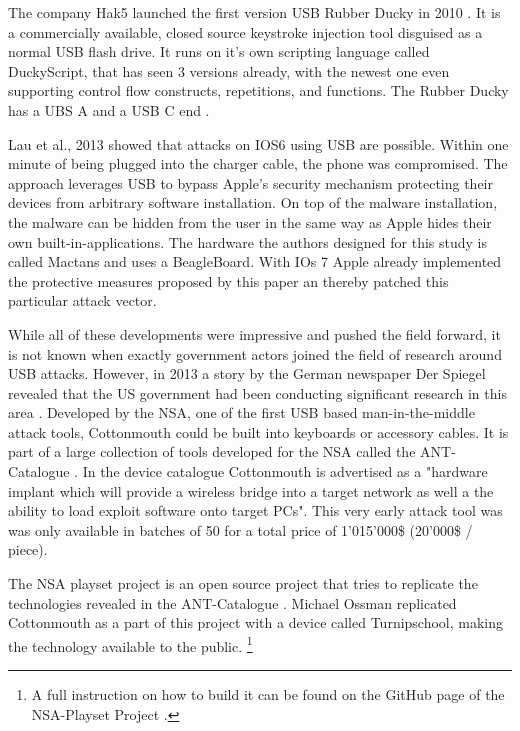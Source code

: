 The company Hak5 launched the first version USB Rubber Ducky in 2010 \cite{USBRubberDucky}. It is a commercially available, closed source keystroke injection tool disguised as a normal USB flash drive. It runs on it's own scripting language called DuckyScript, that has seen 3 versions already, with the newest one even supporting control flow constructs, repetitions, and functions. The Rubber Ducky has a UBS A and a USB C end \cite{USBRubberDucky2023}.  

Lau et al., 2013 \cite{lauMactansInjectingMalware2013} showed that attacks on IOS6 using USB are possible. Within one minute of being plugged into the charger cable, the phone was compromised. The approach leverages USB to bypass Apple's security mechanism protecting their devices from arbitrary software installation. On top of the malware installation, the malware can be hidden from the user in the same way as Apple hides their own built-in-applications. 
The hardware the authors designed for this study is called Mactans and uses a BeagleBoard. With IOs 7 Apple already implemented the protective measures proposed by this paper an thereby patched this particular attack vector. 

While all of these developments were impressive and pushed the field forward, it is not known when exactly government actors joined the field of research around USB attacks. However, in 2013 a story by the German newspaper Der Spiegel revealed that the US government had been conducting significant research in this area \cite{appelbaumCatalogRevealsNSA2013}. Developed by the NSA, one of the first USB based man-in-the-middle attack tools, Cottonmouth could be built into keyboards or accessory cables. It is part of a large collection of tools developed for the NSA called the ANT-Catalogue \cite{InteractiveGraphicNSA}. In the device catalogue Cottonmouth is advertised as a "hardware implant which will provide a wireless bridge into a target network as well a the ability to load exploit software onto target PCs". This very early attack tool was was only available in batches of 50 for a total price of 1'015'000\$ (20'000\$ / piece).

The NSA playset project is an open source project that tries to replicate the technologies revealed in the ANT-Catalogue \cite{NSAPlaysetTurnipschoolHtml}. Michael Ossman replicated Cottonmouth as a part of this  project with a device called Turnipschool, making the technology available to the public. \footnote{A full instruction on how to build it can be found on the GitHub page of the NSA-Playset Project \cite{NSAPlaysetTurnipschoolHtml}. }

